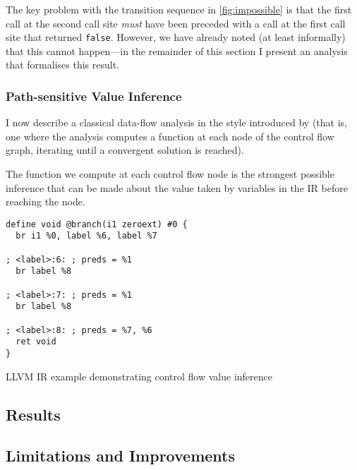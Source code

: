 The key problem with the transition sequence in \autoref{fig:impossible}
is that the first call at the second call site \emph{must} have been
preceded with a call at the first call site that returned
\texttt{false}. However, we have already noted (at least
informally) that this cannot happen---in the remainder of this section I
present an analysis that formalises this result.

\subsubsection{Path-sensitive Value Inference}

I now describe a classical data-flow analysis in the style introduced by
\textcite{kildall_unified_1973} (that is, one where the analysis
computes a function at each node of the control flow graph, iterating
until a convergent solution is reached).

The function we compute at each control flow node is the strongest
possible inference that can be made about the value taken by variables
in the IR before reaching the node.

\begin{listing}[ht]
  \begin{verbatim}
define void @branch(i1 zeroext) #0 {
  br i1 %0, label %6, label %7

; <label>:6: ; preds = %1
  br label %8

; <label>:7: ; preds = %1
  br label %8

; <label>:8: ; preds = %7, %6
  ret void
}
  \end{verbatim}
  \caption{LLVM IR example demonstrating control flow value inference}
  \label{lst:control-flow}
\end{listing}

\subsection{Results}

\subsection{Limitations and Improvements}
